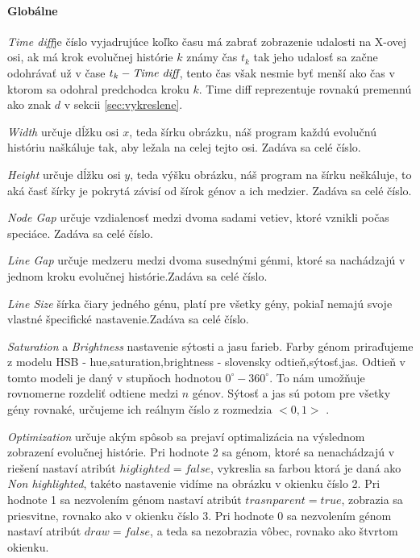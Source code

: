\paragraph{Globálne}\mbox{}\linebreak
\emph{Time diff}je číslo vyjadrujúce koľko času má zabrať zobrazenie udalosti na X-ovej osi, 
ak má krok evolučnej histórie $k$ známy čas $t_k$ tak 
jeho udalosť sa začne odohrávať už v čase $t_k - \emph{Time diff}$, tento čas však nesmie byť menší ako čas
v ktorom sa odohral predchodca kroku $k$. Time diff reprezentuje rovnakú premennú ako znak $d$ v sekcii 
\ref{sec:vykreslene}. 

\emph{Width} určuje dĺžku osi $x$, teda šírku obrázku, náš program každú evolučnú históriu naškáluje tak, aby ležala na celej tejto osi.
Zadáva sa celé číslo.

\emph{Height} určuje dĺžku osi $y$, teda výšku obrázku, náš program na šírku neškáluje, to aká časť šírky je pokrytá závisí od šírok génov a ich medzier.
Zadáva sa celé číslo.

\emph{Node Gap} určuje vzdialenosť medzi dvoma sadami vetiev, ktoré vznikli počas speciáce.
Zadáva sa celé číslo.

\emph{Line Gap} určuje medzeru medzi dvoma susednými génmi, ktoré sa nachádzajú v jednom kroku evolučnej histórie.Zadáva sa celé číslo.

\emph{Line Size} šírka čiary jedného génu, platí pre všetky gény, pokiaľ nemajú svoje vlastné špecifické nastavenie.Zadáva sa celé číslo.

\emph{Saturation} a \emph{Brightness} nastavenie sýtosti a jasu farieb.
Farby génom priraďujeme z modelu HSB - hue,saturation,brightness - slovensky odtieň,sýtosť,jas.
Odtieň v tomto modeli je daný v stupňoch hodnotou $0^\circ-360^\circ$. To nám umožňuje rovnomerne rozdeliť odtiene medzi $n$ génov.
Sýtosť a jas sú potom pre všetky gény rovnaké, určujeme ich reálnym číslo z rozmedzia $<0,1>$ . 


\emph{Optimization} určuje akým spôsob sa prejaví optimalizácia na výslednom zobrazení evolučnej histórie.
Pri hodnote 2 sa génom, ktoré sa nenachádzajú v riešení nastaví atribút $higlighted=false$, vykreslia sa farbou ktorá je daná ako
\emph{Non highlighted}, takéto nastavenie vidíme na obrázku \cite{obr:opt} v okienku číslo 2.
Pri hodnote 1 sa nezvolením génom nastaví atribút $trasnparent=true$, zobrazia sa priesvitne, rovnako ako v okienku číslo 3.
Pri hodnote 0 sa nezvolením génom nastaví atribút $draw=false$, a teda sa nezobrazia vôbec, rovnako ako štvrtom okienku.


